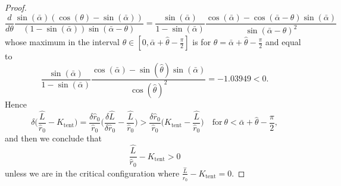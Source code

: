 \documentclass[reqno]{amsart}
\theoremstyle{definition} \newtheorem{definition}{Definition}[section]
\theoremstyle{definition} \newtheorem{remark}[definition]{Remark}
\theoremstyle{plain} \newtheorem{lemma}[definition]{Lemma}
\theoremstyle{plain} \newtheorem{proposition}[definition]{Proposition}
\theoremstyle{plain} \newtheorem{theorem}[definition]{Theorem}
\theoremstyle{plain} \newtheorem{corollary}[definition]{Corollary}
\theoremstyle{definition} \newtheorem{example}[definition]{Example}
\theoremstyle{plain} \newtheorem{claim}[clai]{Claim}
\theoremstyle{definition} \newtheorem{assumption}[definition]{Assumption}
\theoremstyle{definition} \newtheorem{observation}[definition]{Observation}
\newcommand{\1}{\mathbbm 1}
\numberwithin{equation}{section} %
\theoremstyle{plain} \newtheorem*{theorem*}{Theorem}
\theoremstyle{plain} \newtheorem{mthm}[maintheorem]{Main Theorem}
\theoremstyle{plain} \newtheorem*{mthm*}{Main Theorem}
\theoremstyle{plain} \newtheorem*{conjecture*}{Conjecture}
\theoremstyle{plain} \newtheorem{conjecture}[definition]{Conjecture}
\theoremstyle{plain} \newtheorem*{problem*}{Problem}
\begin{document}
\begin{proof}
\begin{equation*}
\frac{d}{d\theta} \frac{\sin(\bar \alpha) (\cos(\theta) - \sin(\bar \alpha))}{(1 - \sin(\bar \alpha)) \sin(\bar \alpha - \theta)} = \frac{\sin(\bar \alpha)}{1 - \sin(\bar \alpha)} \frac{\cos(\bar \alpha) - \cos(\bar \alpha - \theta) \sin(\bar \alpha)}{\sin(\bar \alpha - \theta)^2}
\end{equation*}
whose maximum in the interval $\theta \in [0,\bar \alpha + \hat \theta - \frac{\pi}{2}]$ is for $\theta = \bar \alpha + \hat \theta - \frac{\pi}{2}$ and equal to
\begin{equation*}
\frac{\sin(\bar \alpha)}{1 - \sin(\bar \alpha)} \frac{\cos(\bar \alpha) - \sin(\hat \theta) \sin(\bar \alpha)}{\cos(\hat \theta)^2} = - 1.03949 < 0.
\end{equation*}
Hence
\begin{equation*}
\delta \bigg( \frac{\hat L}{\hat r_0} - K_\mathrm{tent} \bigg) = \frac{\delta \hat r_0}{\hat r_0} \bigg( \frac{\delta \hat L}{\delta \hat r_0} - \frac{\hat L}{\hat r_0} \bigg) > \frac{\delta \hat r_0}{\hat r_0} \bigg( K_\mathrm{tent} - \frac{\hat L}{\hat r_0} \bigg) \quad \text{for} \ \theta < \bar \alpha + \hat \theta - \frac{\pi}{2},
\end{equation*}
and then we conclude that
\begin{equation*}
\frac{\hat L}{\hat r_0} - K_\mathrm{tent} > 0
\end{equation*}
unless we are in the critical configuration where $\frac{\hat L}{\hat r_0} - K_\mathrm{tent} = 0$.


\end{proof}
\end{document}
